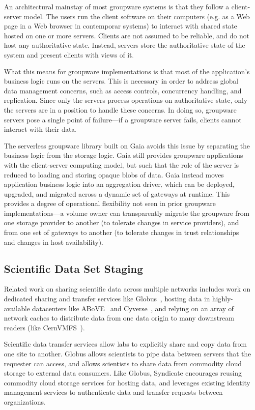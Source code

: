 An architectural mainstay of most groupware systems is that they follow a client-server model.
The users run the client software on their computers (e.g.
as a Web page in a Web browser in contemporar systems) to interact with shared state hosted on one or
more servers.  Clients are not assumed to be reliable, and do not host any
authoritative state.  Instead, servers store the authoritative state of the system and
present clients with views of it.

What this means for groupware implementations is that most of the application's business logic runs on the
servers.  This is necessary in order to address global data management
concerns, such as access controls, concurrency handling, and
replication.  Since only the servers process operations on authoritative state, only
the servers are in a position to handle these concerns.  In doing so, groupware
servers pose a single point of failure---if a groupware server fails, clients
cannot interact with their data.

The serverless groupware library built on Gaia
avoids this issue by separating the business logic from the storage logic.
Gaia still provides groupware applications with the client-server computing model,
but such that the role of the server is reduced to loading
and storing opaque blobs of data.  Gaia instead
moves application business logic into an aggregation driver, which can be
deployed, upgraded, and migrated across a dynamic set of gateways at runtime.
This provides a degree of operational flexibility not seen in prior groupware
implementations---a volume owner can transparently migrate the groupware from
one storage provider to another (to tolerate changes in service providers),
and from one set of gateways to another (to tolerate changes in trust relationships and
changes in host availability).

\subsection{Scientific Data Set Staging}

Related work on sharing scientific data across multiple networks includes
work on dedicated sharing and transfer services like Globus~\cite{globus},
hosting data in highly-available datacenters like ABoVE~\cite{nasa-above} and
Cyverse~\cite{cyverse}, and relying on an array of network caches to distribute
data from one data origin to many downstream readers (like
CernVMFS~\cite{cernvmfs}).

Scientific data transfer services allow labs to explicitly share and copy
data from one site to another.  Globus allows scientists to pipe data between
servers that the requester can access, and allows scientists to share data from
commodity cloud storage to external data consumers.  Like Globus, Syndicate
encourages reusing commodity cloud storage services for hosting data, and
leverages existing identity management services to authenticate data and
transfer requests between organizations.

